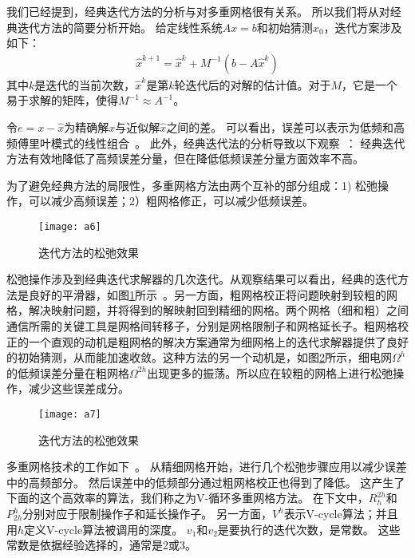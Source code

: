 我们已经提到，经典迭代方法的分析与对多重网格很有关系。 所以我们将从对经典迭代方法的简要分析开始。 给定线性系统$Ax = b$和初始猜测$x_0$，迭代方案涉及如下：
\begin{align}
\hat{x}^{k+1}=\hat{x}^{k}+M^{-1}(b-A\hat{x}^k)
\end{align}
其中$k$是迭代的当前次数，$\hat{x}^k$是第$k$轮迭代后的对解的估计值。对于$M$，它是一个易于求解的矩阵，使得$M^{-1}\approx A^{-1}$。

令$e = x-\hat{x}$为精确解$x$与近似解$\hat{x}$之间的差。 可以看出，误差可以表示为低频和高频傅里叶模式的线性组合~\cite{briggs2000multigrid}。 此外，经典迭代法的分析导致以下观察~\cite{briggs2000multigrid, stuben1982multigrid}：
经典迭代方法有效地降低了高频误差分量，但在降低低频误差分量方面效率不高。

为了避免经典方法的局限性，多重网格方法由两个互补的部分组成：1) 松弛操作，可以减少高频误差；2）粗网格修正，可以减少低频误差。

\begin{figure}[H] %
  \centering
  \texttt{[image: a6]}
  \caption{迭代方法的松弛效果}
  \label{fig:a6}
\end{figure}

松弛操作涉及到经典迭代求解器的几次迭代。从观察结果可以看出，经典的迭代方法是良好的平滑器，如图\ref{fig:a6}所示~\cite{stuben1982multigrid}。另一方面，粗网格校正将问题映射到较粗的网格，解决映射问题，并将得到的解映射回到精细的网格。两个网格（细和粗）之间通信所需的关键工具是网格间转移子，分别是网格限制子和网格延长子。粗网格校正的一个直观的动机是粗网格的解决方案通常为细网格上的迭代求解器提供了良好的初始猜测，从而能加速收敛。这种方法的另一个动机是，如图\ref{fig:a7}所示，细电网$\Omega^h$的低频误差分量在粗网格$\Omega^{2h}$出现更多的振荡。所以应在较粗的网格上进行松弛操作，减少这些误差成分。

\begin{figure}[H] %
  \centering
  \texttt{[image: a7]}
  \caption{迭代方法的松弛效果}
  \label{fig:a7}
\end{figure}

多重网格技术的工作如下~\cite{briggs2000multigrid}。 从精细网格开始，进行几个松弛步骤应用以减少误差中的高频部分。 然后误差中的低频部分通过粗网格校正也得到了降低。 这产生了下面的这个高效率的算法，我们称之为V-循环多重网格方法。 在下文中，$R_h^{2h}$和$P^h_{2h}$分别对应于限制操作子和延长操作子。 另一方面，$V^h$表示V-cycle算法；并且用$h$定义V-cycle算法被调用的深度。 $v_1$和$v_2$是要执行的迭代次数，是常数。 这些常数是依据经验选择的，通常是2或3。

